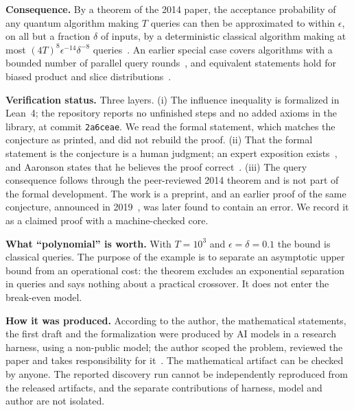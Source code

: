 \documentclass[10pt,a4paper]{article}
\begin{document}
\textbf{Consequence.} By a theorem of the 2014 paper, the acceptance probability of any quantum algorithm making $T$ queries can then be approximated to within $\epsilon$, on all but a fraction $\delta$ of inputs, by a deterministic classical algorithm making at most $(4T)^8\epsilon^{-14}\delta^{-8}$ queries~\cite{turturean2026}. An earlier special case covers algorithms with a bounded number of parallel query rounds~\cite{bdst2026}, and equivalent statements hold for biased product and slice distributions~\cite{gmnr2026}.

\textbf{Verification status.} Three layers. (i) The influence inequality is formalized in Lean~4; the repository reports no unfinished steps and no added axioms in the library, at commit \texttt{2a6ceae}. We read the formal statement, which matches the conjecture as printed, and did not rebuild the proof. (ii) That the formal statement is the conjecture is a human judgment; an expert exposition exists~\cite{blancexpo2026}, and Aaronson states that he believes the proof correct~\cite{aaronsonblog2026}. (iii) The query consequence follows through the peer-reviewed 2014 theorem and is not part of the formal development. The work is a preprint, and an earlier proof of the same conjecture, announced in 2019~\cite{aaronson2019}, was later found to contain an error. We record it as a claimed proof with a machine-checked core.

\textbf{What ``polynomial'' is worth.} With $T=10^3$ and $\epsilon=\delta=0.1$ the bound is \aaBound{} classical queries. The purpose of the example is to separate an asymptotic upper bound from an operational cost: the theorem excludes an exponential separation in queries and says nothing about a practical crossover. It does not enter the break-even model.

\textbf{How it was produced.} According to the author, the mathematical statements, the first draft and the formalization were produced by AI models in a research harness, using a non-public model; the author scoped the problem, reviewed the paper and takes responsibility for it~\cite{turturean2026,psi2026}. The mathematical artifact can be checked by anyone. The reported discovery run cannot be independently reproduced from the released artifacts, and the separate contributions of harness, model and author are not isolated.

\end{document}
